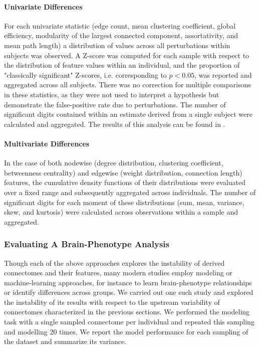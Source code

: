 \documentclass[fleqn,10pt]{SelfArx} %
\newcommand{\new}[1]{{\color{blue} #1}}
\begin{document}
\paragraph{Univariate Differences} For each univariate statistic (edge count, mean clustering coefficient, global
efficiency, modularity of the largest connected component, assortativity, and mean path length) a distribution of
values across all perturbations within subjects was observed. A Z-score was computed for each sample with respect to
the distribution of feature values within an individual, and the proportion of "classically significant" Z-scores, i.e.
corresponding to $p < 0.05$, was reported and aggregated across all subjects. \new{There was no correction for multiple
comparisons in these statistics, as they were not used to interpret a hypothesis but demonstrate the false-positive
rate due to perturbations.} The number of significant digits
contained within an estimate derived from a single subject were calculated and aggregated. \new{The results of this
analysis can be found in \sref{supsec:univar}}.

\paragraph{Multivariate Differences} In the case of both nodewise (degree distribution, clustering coefficient,
betweenness centrality) and edgewise (weight distribution, connection length) features, the cumulative density
functions of their distributions were evaluated over a fixed range and subsequently aggregated across individuals. The
number of significant digits for each moment of these distributions (sum, mean, variance, skew, and kurtosis) were
calculated across observations within a sample and aggregated.

\subsubsection*{Evaluating A Brain-Phenotype Analysis}
Though each of the above approaches explores the instability of derived connectomes and their features, many modern
studies employ modeling or machine-learning approaches, for instance to learn brain-phenotype relationships or identify
differences across groups. We carried out one such study and explored the instability of its results with respect to
the upstream variability of connectomes characterized in the previous sections. We performed the modeling task with a
single sampled connectome per individual and repeated this sampling and modelling 20 times. We report the model
performance for each sampling of the dataset and summarize its variance.
\end{document}
